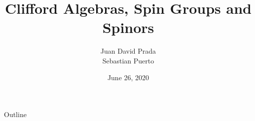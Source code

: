 \documentclass{beamer}
\title[l]{Clifford Algebras, Spin Groups and Spinors}
\author{Juan David Prada\\ Sebastian Puerto}
\institute{Universidad de los Andes}
\date{June 26, 2020}
\theoremstyle{definition}
\theoremstyle{remark}
\begin{document}
\begin{frame}
  \titlepage
\end{frame}

\begin{frame}{Outline}
  \tableofcontents
\end{frame}








\end{document}
